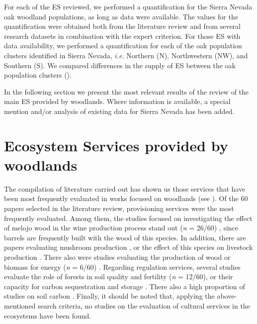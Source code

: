 For each of the ES reviewed, we performed a quantification for the Sierra Nevada oak woodland populations, as long as data were available. The values for the quantification were obtained both from the literature review and from several research datasets in combination with the expert criterion. For those ES with data availability, we performed a quantification for each of the oak population clusters identified in Sierra Nevada, \emph{i.e.} Northern (N), Northwestern (NW), and Southern (S)\autocite[ see][]{PerezLuqueetal2021EcologicalDiversity}. We compared differences in the supply of ES between the oak population clusters ().

In the following section we present the most relevant results of the review of the main ES provided by \Qp woodlands. Where information is available, a special mention and/or analysis of existing data for Sierra Nevada has been added. 
 
\section{Ecosystem Services provided by \Qp woodlands}\label{sec:es:results}

The compilation of literature carried out has shown us those services that have been most frequently evaluated in works focused on \Qp woodlands (see ). Of the 60 papers selected in the literature review, provisioning services were the most frequently evaluated. Among them, the studies focused on investigating the effect of melojo wood in the wine production process stand out (\emph{n} = 26/60) \autocites[\emph{e.g.}][]{FernandezdeSimonetal2010CharacterizationVolatile,CastroVazquezetal2013EvaluationPortuguese}, since barrels are frequently built with the wood of this species. In addition, there are papers evaluating mushroom production \autocites[\emph{e.g.}][]{OriadeRuedaetal2010CouldArtificial}, or the effect of this species on livestock production \autocites[\emph{e.g.}][]{Nunezetal2012LivestockManagement}. There also were studies evaluating the production of wood or biomass for energy (\emph{n} = 6/60) \autocites[\emph{e.g.}][]{Mirandaetal2009EnergeticCharacterization}. Regarding regulation services, several studies evaluate the role of \Qp forests in soil quality and fertility (\emph{n} = 12/60), or their capacity for carbon sequestration and storage \autocites[\emph{n} = 12/60; \emph{e.g.}][]{Alvarezetal2014InfluenceTree}. There also a high proportion of studies on soil carbon \autocites[\emph{n} = 8/60; \emph{e.g.}][]{Fonsecaetal2019ImpactTree}. Finally, it should be noted that, applying the above-mentioned search criteria, no studies on the evaluation of cultural services in the \Qp ecosystems have been found.

